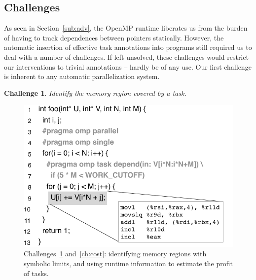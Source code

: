\documentclass[sigplan,10pt,review,anonymous]{acmart}
\newtheorem{Challenge}{Challenge}[section]
\begin{document}
\subsection{Challenges}
\label{sub:dif}

As seen in Section~\ref{sub:adv}, the OpenMP runtime liberates us
from the burden of having to track dependences between pointers statically.
However, the automatic insertion of effective task annotations into
programs still required us to deal with a number of challenges.
If left unsolved, these challenges would restrict our interventions
to trivial annotations -- hardly be of any use.
Our first challenge is inherent to any automatic parallelization system.

\begin{Challenge}
\label{ch:Regions}
Identify the memory region covered by a task.
\end{Challenge}

\begin{figure}[b!]
\begin{center}
\includegraphics[width=1\columnwidth]{images/ex_Regions}
\caption{Challenges~\ref{ch:Regions} and~\ref{ch:cost}: identifying memory regions
with symbolic limits, and using runtime information to estimate the profit of
tasks.}
\label{fig:ex_Regions}
\end{center}
\end{figure}
\end{document}
